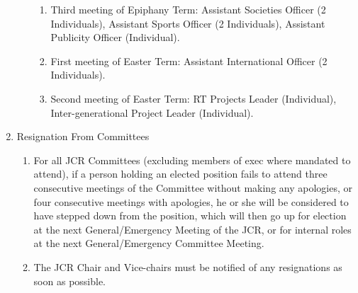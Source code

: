 \begin{enumerate}
\begin{enumerate}
\begin{enumerate}
            \item Third meeting of Epiphany Term: Assistant Societies Officer (2 Individuals), Assistant Sports Officer (2 Individuals), Assistant Publicity Officer (Individual).
            \item First meeting of Easter Term: Assistant International Officer (2 Individuals).
            \item Second meeting of Easter Term: RT Projects Leader (Individual), Inter-generational Project Leader (Individual).
        \end{enumerate}
    \end{enumerate}
    \item Resignation From Committees
    \begin{enumerate}
        \item For all JCR Committees (excluding members of exec where mandated to attend), if a person holding an elected position fails to attend three consecutive meetings of the Committee without making any apologies, or four consecutive meetings with apologies, he or she will be considered to have stepped down from the position, which will then go up for election at the next General/Emergency Meeting of the JCR, or for internal roles at the next General/Emergency Committee Meeting.
        \item The JCR Chair and Vice-chairs must be notified of any resignations as soon as possible.
    \end{enumerate}
\end{enumerate}

